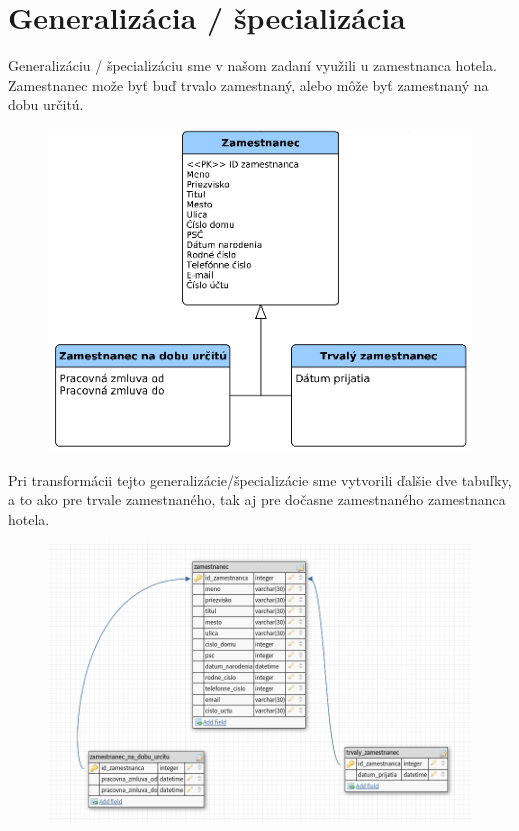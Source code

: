 \documentclass[a4paper,11pt,titlepage]{article}[11.3.2016]
\begin{document}
\newpage

\section{Generalizácia / špecializácia} 
Generalizáciu / špecializáciu sme v našom zadaní využili u zamestnanca hotela. Zamestnanec može byť buď trvalo zamestnaný, alebo môže byť zamestnaný na dobu určitú. 

\begin{center}
\begin{figure}[h]
    \includegraphics{generalizacia.png}
\end{figure}
\end{center}

\newpage

Pri transformácii tejto generalizácie/špecializácie sme vytvorili ďalšie dve tabuľky, a to ako pre trvale zamestnaného, tak aj pre dočasne zamestnaného zamestnanca hotela.

\begin{center}
\begin{figure}[h]
    \includegraphics[scale=0.55]{generalizacia_tabulky.png}
\end{figure}
\end{center}
\end{document}

